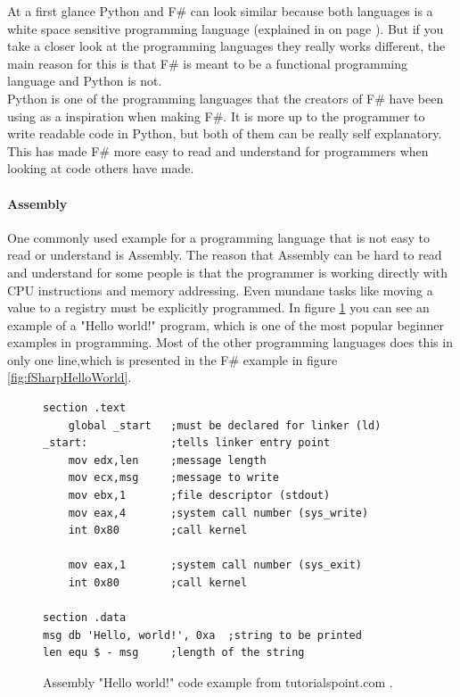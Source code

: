 \documentclass[12pt, a4paper]{article}
\begin{document}
At a first glance Python and F\# can look similar because both languages is a white space sensitive programming language (explained in  on page \pageref{indentationAndCodeStructure}). But if you take a closer look at the programming languages they really works different, the main reason for this is that F\# is meant to be a functional programming language and Python is not.\\

Python is one of the programming languages that the creators of F\# have been using as a inspiration when making F\#. It is more up to the programmer to write readable code in Python, but both of them can be really self explanatory. This has made F\# more easy to read and understand for programmers when looking at code others have made.

\newpage
\paragraph{Assembly} One commonly used example for a programming language that is not easy to read or understand is Assembly. The reason that Assembly can be hard to read and understand for some people is that the programmer is working directly with CPU instructions and memory addressing. Even mundane tasks like moving a value to a registry must be explicitly programmed. In figure \ref{fig:assemblyExample} you can see an example of a "Hello world!" program, which is one of the most popular beginner examples in programming. Most of the other programming languages does this in only one line,which is presented in the F\# example in figure \ref{fig:fSharpHelloWorld}.\\

\begin{figure}[!h]
	\begin{lstlisting}
section	.text
    global _start   ;must be declared for linker (ld)
_start:	            ;tells linker entry point
    mov	edx,len     ;message length
    mov	ecx,msg     ;message to write
    mov	ebx,1       ;file descriptor (stdout)
    mov	eax,4       ;system call number (sys_write)
    int	0x80        ;call kernel
	
    mov	eax,1       ;system call number (sys_exit)
    int	0x80        ;call kernel

section	.data
msg db 'Hello, world!', 0xa  ;string to be printed
len equ $ - msg     ;length of the string
	\end{lstlisting}
	\caption{Assembly "Hello world!" code example from tutorialspoint.com \cite{tutorialspoint}.}
	\label{fig:assemblyExample}
\end{figure}
\end{document}

